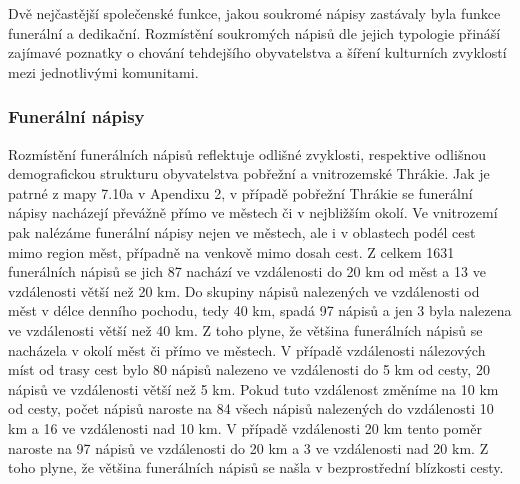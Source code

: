 Dvě nejčastější společenské funkce, jakou soukromé nápisy zastávaly byla funkce funerální a dedikační. Rozmístění soukromých nápisů dle jejich typologie přináší zajímavé poznatky o chování tehdejšího obyvatelstva a šíření kulturních zvyklostí mezi jednotlivými komunitami.

\subsubsection[funerální-nápisy-19]{Funerální nápisy}

Rozmístění funerálních nápisů reflektuje odlišné zvyklosti, respektive odlišnou demografickou strukturu obyvatelstva pobřežní a vnitrozemské Thrákie. Jak je patrné z mapy 7.10a v Apendixu 2, v případě pobřežní Thrákie se funerální nápisy nacházejí převážně přímo ve městech či v nejbližším okolí. Ve vnitrozemí pak nalézáme funerální nápisy nejen ve městech, ale i v oblastech podél cest mimo region měst, případně na venkově mimo dosah cest. Z celkem 1631 funerálních nápisů se jich 87  nachází ve vzdálenosti do 20 km od měst a 13  ve vzdálenosti větší než 20 km. Do skupiny nápisů nalezených ve vzdálenosti od měst v délce denního pochodu, tedy 40 km, spadá 97  nápisů a jen 3  byla nalezena ve vzdálenosti větší než 40 km. Z toho plyne, že většina funerálních nápisů se nacházela v okolí měst či přímo ve městech. V případě vzdálenosti nálezových míst od trasy cest bylo 80  nápisů nalezeno ve vzdálenosti do 5 km od cesty, 20  nápisů ve vzdálenosti větší než 5 km. Pokud tuto vzdálenost změníme na 10 km od cesty, počet nápisů naroste na 84  všech nápisů nalezených do vzdálenosti 10 km a 16  ve vzdálenosti nad 10 km. V případě vzdálenosti 20 km tento poměr naroste na 97  nápisů ve vzdálenosti do 20 km a 3  ve vzdálenosti nad 20 km. Z toho plyne, že většina funerálních nápisů se našla v bezprostřední blízkosti cesty.

